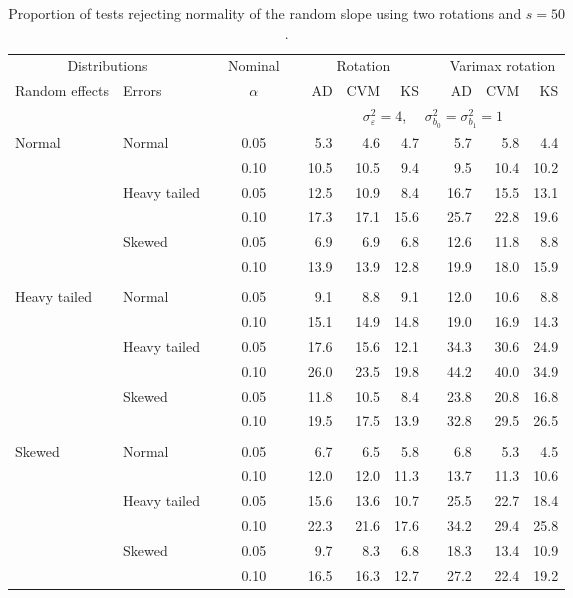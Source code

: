 \begin{table}[ht]
\centering
\caption{\label{tab:fixedsimb150} Proportion of tests rejecting normality of the random slope using two rotations and $s = 50$.}
\begin{scriptsize}
\begin{tabular}{ll p{.1cm} c p{.1cm} rrr p{.1cm} rrr}
  \hline
  \multicolumn{2}{c}{Distributions}& & Nominal & &  \multicolumn{3}{c}{Rotation} & & \multicolumn{3}{c}{Varimax rotation} \\ \cline{1-2} \cline{6-8} \cline{10-12}   
  Random effects & Errors & & $\alpha$ & & AD & CVM & KS & & AD & CVM & KS \\ 
   \hline
& && && \multicolumn{7}{c}{$\sigma_{\varepsilon}^2 = 4$, \ \ $\sigma_{b_0}^2 = \sigma_{b_1}^2 = 1$} \\ \cline{6-12}
\rowcolor{gray!20} Normal & Normal &  & 0.05 &  & 5.3 & 4.6 & 4.7 &  & 5.7 & 5.8 & 4.4 \\ 
\rowcolor{gray!20}    &  &  & 0.10 &  & 10.5 & 10.5 & 9.4 &  & 9.5 & 10.4 & 10.2 \\ 
\rowcolor{gray!20}    & Heavy tailed &  & 0.05 &  & 12.5 & 10.9 & 8.4 &  & 16.7 & 15.5 & 13.1 \\ 
\rowcolor{gray!20}    &  &  & 0.10 &  & 17.3 & 17.1 & 15.6 &  & 25.7 & 22.8 & 19.6 \\ 
\rowcolor{gray!20}    & Skewed &  & 0.05 &  & 6.9 & 6.9 & 6.8 &  & 12.6 & 11.8 & 8.8 \\ 
\rowcolor{gray!20}    &  &  & 0.10 &  & 13.9 & 13.9 & 12.8 &  & 19.9 & 18.0 & 15.9 \\ 
&&&&&&&&&&&\\
  Heavy tailed & Normal &  & 0.05 &  & 9.1 & 8.8 & 9.1 &  & 12.0 & 10.6 & 8.8 \\ 
   &  &  & 0.10 &  & 15.1 & 14.9 & 14.8 &  & 19.0 & 16.9 & 14.3 \\ 
   & Heavy tailed &  & 0.05 &  & 17.6 & 15.6 & 12.1 &  & 34.3 & 30.6 & 24.9 \\ 
   &  &  & 0.10 &  & 26.0 & 23.5 & 19.8 &  & 44.2 & 40.0 & 34.9 \\ 
   & Skewed &  & 0.05 &  & 11.8 & 10.5 & 8.4 &  & 23.8 & 20.8 & 16.8 \\ 
   &  &  & 0.10 &  & 19.5 & 17.5 & 13.9 &  & 32.8 & 29.5 & 26.5 \\ 
&&&&&&&&&&&\\
  Skewed & Normal &  & 0.05 &  & 6.7 & 6.5 & 5.8 &  & 6.8 & 5.3 & 4.5 \\ 
   &  &  & 0.10 &  & 12.0 & 12.0 & 11.3 &  & 13.7 & 11.3 & 10.6 \\ 
   & Heavy tailed &  & 0.05 &  & 15.6 & 13.6 & 10.7 &  & 25.5 & 22.7 & 18.4 \\ 
   &  &  & 0.10 &  & 22.3 & 21.6 & 17.6 &  & 34.2 & 29.4 & 25.8 \\ 
   & Skewed &  & 0.05 &  & 9.7 & 8.3 & 6.8 &  & 18.3 & 13.4 & 10.9 \\ 
   &  &  & 0.10 &  & 16.5 & 16.3 & 12.7 &  & 27.2 & 22.4 & 19.2 \\ 


\end{tabular}
\end{scriptsize}
\end{table}
